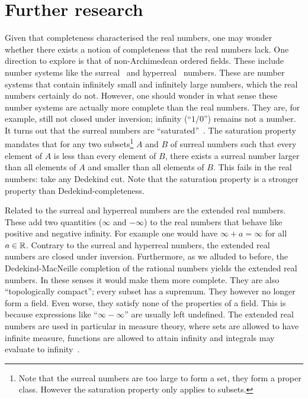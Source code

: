 \documentclass[../main.tex]{subfiles}
\begin{document}
\section{Further research}\label{sec:the_real_numbers:further_research}
Given that completeness characterised the real numbers, one may wonder wheth\-er there exists a notion of completeness that the real numbers lack. One direction to explore is that of non-Archimedean ordered fields. These include number systems like the surreal~\cite{Conway1976} and hyperreal~\cite{Goldblatt1998} numbers. These are number systems that contain infinitely small and infinitely large numbers, which the real numbers certainly do not. However, one should wonder in what sense these number systems are actually more complete than the real numbers. They are, for example, still not closed under inversion; infinity (``$1/0$'') remains not a number. It turns out that the surreal numbers are ``saturated''~\cite{Michael1963}. The saturation property mandates that for any two subsets\footnote{Note that the surreal numbers are too large to form a set, they form a proper class. However the saturation property only applies to subsets.} $A$ and $B$ of surreal numbers such that every element of $A$ is less than every element of $B$, there exists a surreal number larger than all elements of $A$ and smaller than all elements of $B$. This fails in the real numbers: take any Dedekind cut. Note that the saturation property is a stronger property than Dedekind-completeness.

Related to the surreal and hyperreal numbers are the extended real numbers. These add two quantities ($\infty$ and $-\infty$) to the real numbers that behave like positive and negative infinity. For example one would have $\infty+a=\infty$ for all $a\in\mathbb{R}$. Contrary to the surreal and hyperreal numbers, the extended real numbers are closed under inversion. Furthermore, as we alluded to before, the Dedekind-MacNeille completion of the rational numbers yields the extended real numbers. In these senses it would make them more complete. They are also ``topologically compact''; every subset has a supremum. They however no longer form a field. Even worse, they satisfy none of the properties of a field. This is because expressions like ``$\infty-\infty$'' are usually left undefined. The extended real numbers are used in particular in measure theory, where sets are allowed to have infinite measure, functions are allowed to attain infinity and integrals may evaluate to infinity~\cite{Veraar2022}.
\end{document}
